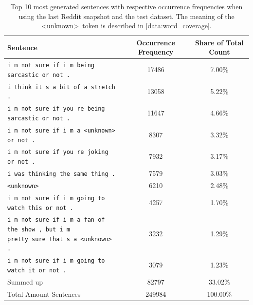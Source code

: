 \begin{table}[H]
	\centering
	\begin{adjustbox}{max width=\textwidth}
		\begin{tabular}{lcc}
			\toprule
			Sentence & Occurrence Frequency & Share of Total Count\\ \midrule
			\texttt{i m not sure if i m being sarcastic or not .} & 17486 & 7.00\%\\
			\texttt{i think it s a bit of a stretch .} & 13058 & 5.22\%\\
			\texttt{i m not sure if you re being sarcastic or not .} & 11647 & 4.66\%\\
			\texttt{i m not sure if i m a <unknown> or not .} & 8307 & 3.32\%\\
			\texttt{i m not sure if you re joking or not .} & 7932 & 3.17\%\\
			\texttt{i was thinking the same thing .} & 7579 & 3.03\%\\
			\texttt{<unknown>} & 6210 & 2.48\%\\
			\texttt{i m not sure if i m going to watch this or not .} & 4257 & 1.70\%\\
			\specialcell{\texttt{i m not sure if i m a fan of the show , but i m}\\\texttt{pretty sure that s a <unknown> .}} & 3232 & 1.29\%\\
			\texttt{i m not sure if i m going to watch it or not .} & 3079 & 1.23\%\\
			\midrule
			Summed up & 82797 & 33.02\%\\
			\midrule
			\midrule
			Total Amount Sentences & 249984 & 100.00\%\\
			\bottomrule
		\end{tabular}
	\end{adjustbox}
	\caption{Top 10 most generated sentences with respective occurrence frequencies when using the last Reddit snapshot and the test dataset. The meaning of the \textless unknown\textgreater \ token is described in \ref{data:word_coverage}.}
	\label{results:test_performance:reddit_sample_outputs}
\end{table}

